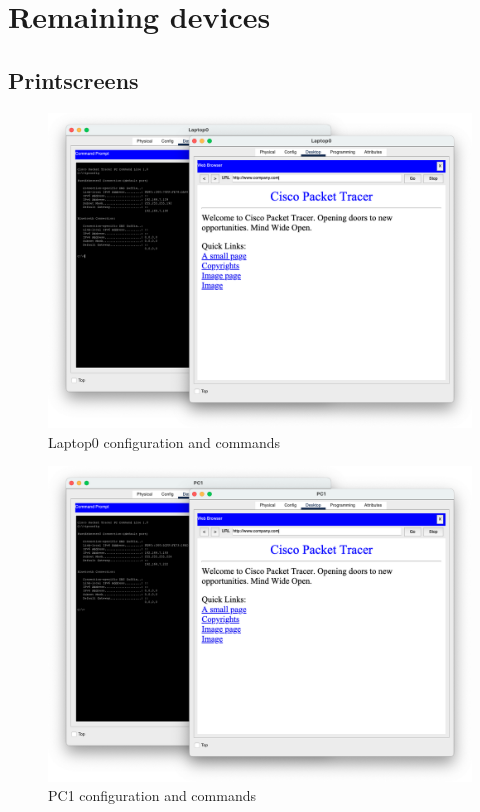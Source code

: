 \documentclass[11pt,a4paper]{report}
\begin{document}
        \lstset{style=termoutputs}
        
        

    \chapter{Remaining devices}
        \section{Printscreens}
        \label{printscreens}

        \begin{figure}[h]
            \centering
            \includegraphics[scale=0.40]{Laptop0}
            \caption{Laptop0 configuration and commands}
            \label{tab:laptop0conf}
        \end{figure}

        \begin{figure}[h]
            \centering
            \includegraphics[scale=0.40]{PC1}
            \caption{PC1 configuration and commands}
            \label{tab:pc1conf}
        \end{figure}
\end{document}
